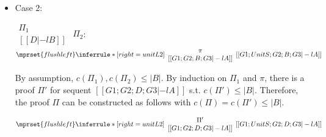 \begin{itemize}
\item Case 2:
      \begin{center}
        \scriptsize
        \begin{math}
          \begin{array}{c}
            \Pi_1 \\
            {[[D |-l B]]}
          \end{array}
        \end{math}
        \qquad\qquad
        $\Pi_2$:
        \begin{math}
          $$\mprset{flushleft}
          \inferrule* [right={\tiny unitL2}] {
            {
              \begin{array}{c}
                \pi \\
                {[[G1; G2; B; G3 |-l A]]}
              \end{array}
            }
          }{[[G1; UnitS; G2; B; G3 |-l A]]}
        \end{math}
      \end{center}
      By assumption, $c(\Pi_1),c(\Pi_2)\leq |B|$. By induction on $\Pi_1$
      and $\pi$, there is a proof $\Pi'$ for sequent
      $[[G1; G2; D; G3 |-l A]]$
      s.t. $c(\Pi') \leq |B|$. Therefore, the proof $\Pi$ can be
      constructed as follows with $c(\Pi) = c(\Pi') \leq |B|$.
      \begin{center}
        \scriptsize
        \begin{math}
          $$\mprset{flushleft}
          \inferrule* [right={\tiny unitL2}] {
            {
              \begin{array}{c}
                \Pi' \\
                {[[G1; G2; D; G3 |-l A]]}
              \end{array}
            }
          }{[[G1; UnitS; G2; D; G3 |-l A]]}
        \end{math}
      \end{center}
\end{itemize}



